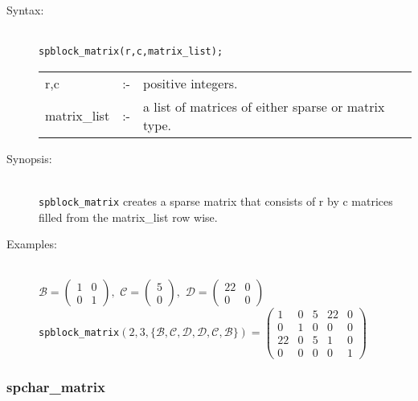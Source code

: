 \begin{description}

\item[Syntax:]\mbox{}\\
\texttt{spblock\_matrix(r,c,matrix\_list);}\\[2mm]
\begin{tabular}{l l l}
r,c          &:-& positive integers. \\
matrix\_list &:-& a list of matrices of either sparse or matrix type.
\end{tabular}

\item[Synopsis:]\mbox{}\\
\texttt{spblock\_matrix} creates a sparse matrix that consists of r by c matrices
filled from the matrix\_list row wise.

\item[Examples:]\mbox{}\\
\(\mathcal{B} = \begin{pmatrix} 1 & 0 \\ 0 & 1 \end{pmatrix}, \,\,
 \mathcal{C} = \begin{pmatrix} 5 \\ 0 \end{pmatrix}, \,\,
 \mathcal{D} = \begin{pmatrix} 22 & 0 \\ 0 & 0 \end{pmatrix}\) \\[2mm]
\texttt{spblock\_matrix}\((2,3,\{\mathcal{B,C,D,D,C,B}\})  =
\begin{pmatrix} 1 & 0 & 5 & 22 & 0 \\ 0 & 1 & 0 & 0 & 0 \\
22 & 0 & 5 & 1 & 0 \\ 0 & 0 & 0 & 0 & 1
\end{pmatrix}\)
\end{description}

\subsubsection{spchar\_matrix}
\label{sparse:spchar_matrix}


